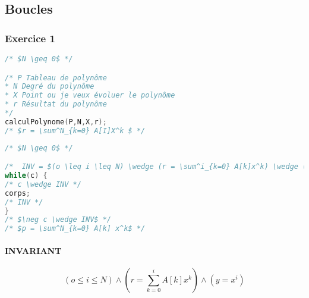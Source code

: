 \subsection{Boucles}\label{exoPfpBoucles}
\subsubsection{Exercice 1}
\begin{lstlisting}[language=C]
/* $N \geq 0$ */

/* P Tableau de polynôme
* N Degré du polynôme
* X Point ou je veux évoluer le polynôme
* r Résultat du polynôme
*/
calculPolynome(P,N,X,r);
/* $r = \sum^N_{k=0} A[I]X^k $ */
\end{lstlisting}
\begin{lstlisting}[language=C]
/* $N \geq 0$ */

/*	INV = $(o \leq i \leq N) \wedge (r = \sum^i_{k=0} A[k]x^k) \wedge (y = x^i)$*/
while(c) {
/* c \wedge INV */
corps;
/* INV */
}
/* $\neg c \wedge INV$ */
/* $p = \sum^N_{k=0} A[k] x^k$ */
\end{lstlisting}
\paragraph{INVARIANT}
$$(o \leq i \leq N) \wedge (r = \sum^i_{k=0} A[k]x^k) \wedge (y = x^i)$$
